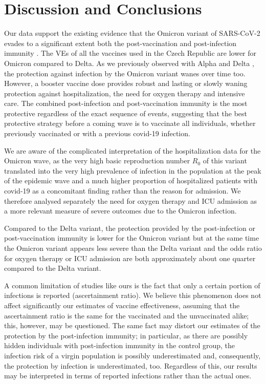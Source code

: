\documentclass[9pt,twocolumn,twoside,lineno]{pnas-new}
\begin{document}
\section*{Discussion and Conclusions}
\label{sec4}

Our data support the existing evidence that the Omicron variant of SARS-CoV-2 evades to a significant extent both the post-vaccination and post-infection immunity \citep{mccallum2022,Dejnirattisai2022,Hoffmann2022,Cui2022,Cao2021}. The VEs of all the vaccines used in the Czech Republic are lower for Omicron compared to Delta. As we previously observed with Alpha and Delta \citep{Berec2021preprint}, the protection against infection by the Omicron variant wanes over time too. However, a booster vaccine dose provides robust and lasting or slowly waning protection against hospitalization, the need for oxygen therapy and intensive care. The combined post-infection and post-vaccination immunity is the most protective regardless of the exact sequence of events, suggesting that the best protective strategy before a coming wave is to vaccinate all individuals, whether previously vaccinated or with a previous covid-19 infection.

We are aware of the complicated interpretation of the hospitalization data for the Omicron wave, as the very high basic reproduction number $R_0$ of this variant \cite{nishiura2022relative} translated into the very high prevalence of infection in the population at the peak of the epidemic wave and a much higher proportion of hospitalized patients with covid-19 as a concomitant finding rather than the reason for admission. We therefore analysed separately the need for oxygen therapy and ICU admission as a more relevant measure of severe outcomes due to the Omicron infection.

Compared to the Delta variant, the protection provided by the post-infection or post-vaccination immunity is lower for the Omicron variant but at the same time the Omicron variant appears less severe than the Delta variant and the odds ratio for oxygen therapy or ICU admission are both approximately about one quarter compared to the Delta variant.

A common limitation of studies like ours is the fact that only a certain portion of infections is reported (ascertainment ratio).  We believe this phenomenon does not affect significantly our estimates of vaccine effectiveness, assuming that the ascertainment ratio is the same for the vaccinated and the unvaccinated alike; this, however, may be questioned. The same fact may distort our estimates of the protection by the post-infection immunity; in particular, as there are possibly hidden individuals with post-infection immunity in the control group, the infection risk of a virgin population is possibly underestimated and, consequently, the protection by infection is underestimated, too. Regardless of this, our results may be interpreted in terms of reported infections rather than the actual ones. 
\end{document}
